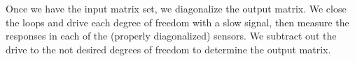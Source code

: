 Once we have the input matrix set, we diagonalize the output matrix. We close the loops and drive each degree of freedom with a slow signal, then measure the responses in each of the (properly diagonalized) sensors. We subtract out the drive to the not desired degrees of freedom to determine the output matrix. 
%
